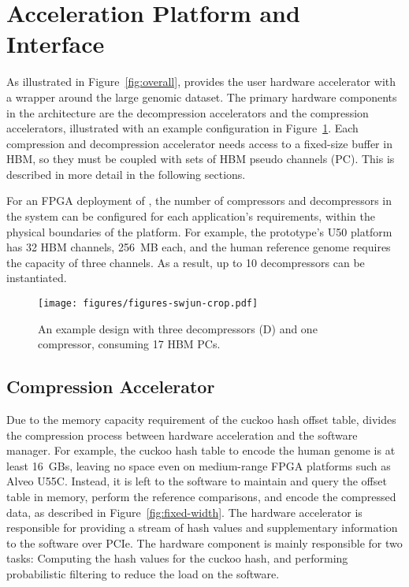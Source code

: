 \section{Acceleration Platform and Interface}
\label{sec:hardware}

As illustrated in Figure~\ref{fig:overall}, \name{} provides the user hardware accelerator with a wrapper around the large genomic dataset.
The primary hardware components in the architecture are the decompression accelerators and the compression accelerators, illustrated with an example configuration in Figure~\ref{fig:hardware}.
Each compression and decompression accelerator needs access to a fixed-size buffer in HBM, so they must be coupled with sets of HBM pseudo channels (PC).
This is described in more detail in the following sections.

For an FPGA deployment of \name{}, the number of compressors and decompressors in the system can be configured for each application's requirements, within the physical boundaries of the platform.
For example, the prototype's U50 platform has 32 HBM channels, 256~MB each, and the human reference genome requires the capacity of three channels.
As a result, up to 10 decompressors can be instantiated.

\begin{figure}[htb]
    \centering
    \texttt{[image: figures/figures-swjun-crop.pdf]}
    \caption{An example design with three decompressors (D) and one compressor, consuming 17 HBM PCs.}
    \label{fig:hardware}
\end{figure}


\subsection{Compression Accelerator}
\label{sec:compression_arch}

Due to the memory capacity requirement of the cuckoo hash offset table, \name{} divides the compression process between hardware acceleration and the software manager.
For example, the cuckoo hash table to encode the human genome is at least 16~GBs, leaving no space even on medium-range FPGA platforms such as Alveo U55C.
Instead, it is left to the software to maintain and query the offset table in memory, perform the reference comparisons, and encode the compressed data, as described in Figure~\ref{fig:fixed-width}.
The hardware accelerator is responsible for providing a stream of hash values and supplementary information to the software over PCIe.
The hardware component is mainly responsible for two tasks: Computing the hash values for the cuckoo hash, and performing probabilistic filtering to reduce the load on the software.

